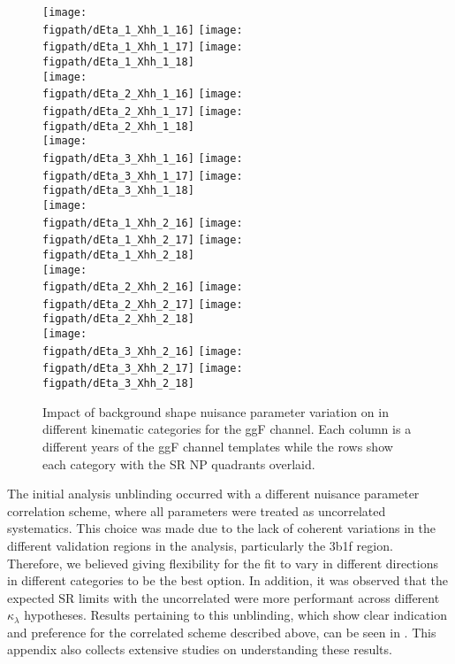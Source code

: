\begin{figure}[ht]
	\centering
	\texttt{[image: \\figpath/dEta\_1\_Xhh\_1\_16]}
	\texttt{[image: \\figpath/dEta\_1\_Xhh\_1\_17]}
	\texttt{[image: \\figpath/dEta\_1\_Xhh\_1\_18]}
	\\
	\texttt{[image: \\figpath/dEta\_2\_Xhh\_1\_16]}
	\texttt{[image: \\figpath/dEta\_2\_Xhh\_1\_17]}
	\texttt{[image: \\figpath/dEta\_2\_Xhh\_1\_18]}
	\\
	\texttt{[image: \\figpath/dEta\_3\_Xhh\_1\_16]}
	\texttt{[image: \\figpath/dEta\_3\_Xhh\_1\_17]}
	\texttt{[image: \\figpath/dEta\_3\_Xhh\_1\_18]}
	\\
	\texttt{[image: \\figpath/dEta\_1\_Xhh\_2\_16]}
	\texttt{[image: \\figpath/dEta\_1\_Xhh\_2\_17]}
	\texttt{[image: \\figpath/dEta\_1\_Xhh\_2\_18]}
	\\
	\texttt{[image: \\figpath/dEta\_2\_Xhh\_2\_16]}
	\texttt{[image: \\figpath/dEta\_2\_Xhh\_2\_17]}
	\texttt{[image: \\figpath/dEta\_2\_Xhh\_2\_18]}
	\\
	\texttt{[image: \\figpath/dEta\_3\_Xhh\_2\_16]}
	\texttt{[image: \\figpath/dEta\_3\_Xhh\_2\_17]}
	\texttt{[image: \\figpath/dEta\_3\_Xhh\_2\_18]}
	\caption{Impact of background shape nuisance parameter variation on \mhh in different kinematic categories for the ggF channel. Each column is a different years of the ggF channel templates while the rows show each category with the SR NP quadrants overlaid.}	 
	\label{fig:sr-np-impact-by-cat}
\end{figure}



The initial analysis unblinding occurred with a different nuisance parameter correlation scheme, where all parameters were treated as uncorrelated systematics.
This choice was made due to the lack of coherent variations in the different validation regions in the analysis, particularly the 3b1f region. Therefore, we believed giving flexibility for the fit to vary in different directions in different categories to be the best option. 
In addition, it was observed that the expected SR limits with the uncorrelated were more performant across different $\kappa_\lambda$ hypotheses. 
Results pertaining to this unblinding, which show clear indication and preference for the correlated scheme described above, can be seen in \App{\ref{app:unb-studies}}. This appendix also collects extensive studies on understanding these results.

\FloatBarrier
